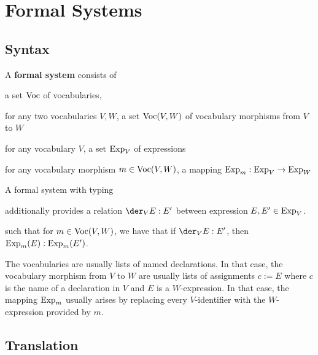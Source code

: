 \section{Formal Systems}


\subsection{Syntax}

\begin{definition}\label{def:css}
A \textbf{formal system} consists of
\begin{compactitem}
 \item a set $\mathrm{Voc}$ of vocabularies,
 \item for any two vocabularies $V,W$, a set $\mathrm{Voc}(V,W)$ of vocabulary morphisms from $V$ to $W$
 \item for any vocabulary $V$, a set $\mathrm{Exp}_V$ of expressions
 \item for any vocabulary morphism $m\in\mathrm{Voc}(V,W)$, a mapping $\mathrm{Exp}_m:\mathrm{Exp}_V\to \mathrm{Exp}_W$
\end{compactitem}

A formal system with typing
\begin{compactitem}
\item additionally provides a relation $\der_V E:E'$ between expression $E,E'\in\mathrm{Exp}_V$.
\item such that for $m\in\mathrm{Voc}(V,W)$, we have that if $\der_V E:E'$, then $\mathrm{Exp}_m(E):\mathrm{Exp}_m(E')$.
\end{compactitem}
\end{definition}

The vocabularies are usually lists of named declarations.
In that case, the vocabulary morphism from $V$ to $W$ are usually lists of assignments $c:=E$ where $c$ is the name of a declaration in $V$ and $E$ is a $W$-expression.
In that case, the mapping $\mathrm{Exp}_m$ usually arises by replacing every $V$-identifier with the $W$-expression provided by $m$.

\subsection{Translation}

